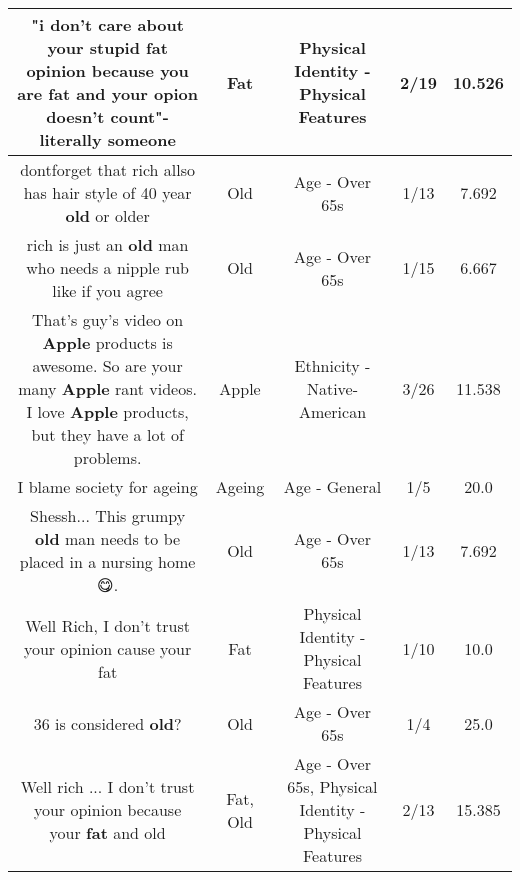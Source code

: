 \documentclass[11pt]{article}
\newlength\mylength
\begin{document}
\begin{center}
\begin{longtable}{|C{.65\mylength}|C{.30\mylength}|C{.12\mylength}|C{.12\mylength}|C{.12\mylength}|}
  \small "i don't care about your stupid \textbf{fat} opinion because you are \textbf{fat} and your opion doesn't count"-literally someone\normalsize   & Fat & Physical Identity - Physical Features & 2/19 & 10.526 \\  \hline
  \small dontforget  that rich allso has hair style of 40 year \textbf{old} or older\normalsize   & Old & Age - Over 65s & 1/13 & 7.692 \\  \hline
  \small rich is just an \textbf{old} man who needs a nipple rub like if you agree\normalsize   & Old & Age - Over 65s & 1/15 & 6.667 \\  \hline
  \small That's guy's video on \textbf{Apple} products is awesome. So are your many \textbf{Apple} rant videos.  I love \textbf{Apple} products, but they have a lot of problems.\normalsize   & Apple & Ethnicity - Native-American & 3/26 & 11.538 \\  \hline
  \small I blame society for ageing\normalsize   & Ageing & Age - General & 1/5 & 20.0 \\  \hline
  \small Shessh... This grumpy \textbf{old} man needs to be placed in a nursing home😋.\normalsize   & Old & Age - Over 65s & 1/13 & 7.692 \\  \hline
  \small Well Rich, I don't trust your opinion cause your fat\normalsize   & Fat & Physical Identity - Physical Features & 1/10 & 10.0 \\  \hline
  \small 36 is considered \textbf{old}?\normalsize   & Old & Age - Over 65s & 1/4 & 25.0 \\  \hline
  \small Well rich ... I don't trust your opinion because your \textbf{fat} and old\normalsize   & Fat, Old & Age - Over 65s, Physical Identity - Physical Features & 2/13 & 15.385 \\  \hline

\end{longtable}
\end{center}
\end{document}
